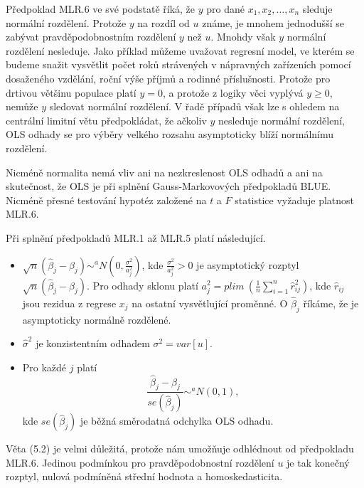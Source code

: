 Předpoklad MLR.6 ve své podstatě říká, že $y$ pro dané $x_1, x_2, ..., x_n$ sleduje normální rozdělení. Protože $y$ na rozdíl od $u$ 
známe, je mnohem jednodušší se zabývat pravděpodobnostním rozdělení $y$ než $u$. Mnohdy však $y$ normální 
rozdělení nesleduje. Jako příklad můžeme uvažovat regresní model, ve kterém se budeme snažit vysvětlit počet roků strávených v 
nápravných zařízeních pomocí dosaženého vzdělání, roční výše příjmů a rodinné příslušnosti. Protože pro drtivou většinu 
populace platí $y = 0$, a protože z logiky věci vyplývá $y \ge 0$, nemůže $y$ sledovat normální rozdělení. V řadě případů však lze s 
ohledem na centrální limitní větu předpokládat, že ačkoliv $y$ nesleduje normální rozdělení, OLS odhady se pro výběry velkého rozsahu 
asymptoticky blíží normálnímu rozdělení.

Nicméně normalita nemá vliv ani na nezkreslenost OLS odhadů a ani na skutečnost, že OLS je při splnění Gauss-Markovových předpokladů 
BLUE. Nicméně přesné testování hypotéz založené na $t$ a $F$ statistice vyžaduje platnost MLR.6.

\begin{theorem}
Při splnění předpokladů MLR.1 až MLR.5 platí následující.
\begin{itemize}
\item $\sqrt{n} (\hat{\beta}_j - \beta_j) \sim^a N(0, \frac{\sigma^2}{a_j^2})$, kde $\frac{\sigma^2}{a_j^2} > 0$ je asymptotický 
rozptyl $\sqrt{n}(\hat{\beta}_j - \beta_j)$. Pro odhady sklonu platí $a_j^2 = plim ~ \left(\frac{1}{n} \sum_{i = 1}^n \hat{r}_{ij}^2 \right)$, kde 
$\hat{r}_{ij}$ jsou rezidua z regrese $x_j$ na ostatní vysvětlující proměnné. O $\hat{\beta}_j$ říkáme, že je asymptoticky normálně rozdělené.
\item $\hat{\sigma}^2$ je konzistentním odhadem $\sigma^2 = var[u]$.
\item Pro každé $j$ platí
\begin{equation}
\frac{\hat{\beta}_j - \beta_j}{se(\hat{\beta}_j)} \sim^a N(0, 1),
\end{equation}
kde $se(\hat{\beta}_j)$ je běžná směrodatná odchylka OLS odhadu.
\end{itemize}

\raggedleft{$\clubsuit$}
\end{theorem}

Věta (5.2) je velmi důležitá, protože nám umožňuje odhlédnout od předpokladu MLR.6. Jedinou podmínkou pro pravděpodobnostní rozdělení 
$u$ je tak konečný rozptyl, nulová podmíněná střední hodnota a homoskedasticita.

